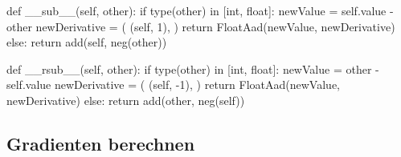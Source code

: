 \documentclass[
  a4paper,
  DIV=11]{scrreprt}
\newenvironment{Shaded}{\begin{snugshade}}{\end{snugshade}}
\newcommand{\BuiltInTok}[1]{\textcolor[rgb]{0.00,0.23,0.31}{#1}}
\newcommand{\ControlFlowTok}[1]{\textcolor[rgb]{0.00,0.23,0.31}{#1}}
\newcommand{\DecValTok}[1]{\textcolor[rgb]{0.68,0.00,0.00}{#1}}
\newcommand{\FunctionTok}[1]{\textcolor[rgb]{0.28,0.35,0.67}{#1}}
\newcommand{\KeywordTok}[1]{\textcolor[rgb]{0.00,0.23,0.31}{#1}}
\newcommand{\NormalTok}[1]{\textcolor[rgb]{0.00,0.23,0.31}{#1}}
\newcommand{\OperatorTok}[1]{\textcolor[rgb]{0.37,0.37,0.37}{#1}}
\newcommand{\VariableTok}[1]{\textcolor[rgb]{0.07,0.07,0.07}{#1}}
\theoremstyle{definition}
\theoremstyle{definition}
\theoremstyle{remark}
\begin{document}
\begin{tcolorbox}[enhanced jigsaw, titlerule=0mm, title=\textcolor{quarto-callout-tip-color}{\faLightbulb}\hspace{0.5em}{Lösung}, breakable, coltitle=black, leftrule=.75mm, bottomrule=.15mm, colback=white, rightrule=.15mm, opacitybacktitle=0.6, bottomtitle=1mm, toptitle=1mm, left=2mm, toprule=.15mm, colbacktitle=quarto-callout-tip-color!10!white, colframe=quarto-callout-tip-color-frame, arc=.35mm, opacityback=0]

\begin{Shaded}
\begin{Highlighting}[]
\KeywordTok{def} \FunctionTok{\_\_sub\_\_}\NormalTok{(}\VariableTok{self}\NormalTok{, other):}
    \ControlFlowTok{if} \BuiltInTok{type}\NormalTok{(other) }\KeywordTok{in}\NormalTok{ [}\BuiltInTok{int}\NormalTok{, }\BuiltInTok{float}\NormalTok{]:}
\NormalTok{        newValue }\OperatorTok{=} \VariableTok{self}\NormalTok{.value }\OperatorTok{{-}}\NormalTok{ other}
\NormalTok{        newDerivative }\OperatorTok{=}\NormalTok{ (}
\NormalTok{            (}\VariableTok{self}\NormalTok{, }\DecValTok{1}\NormalTok{),}
\NormalTok{        )}
        \ControlFlowTok{return}\NormalTok{ FloatAad(newValue, newDerivative)}
    \ControlFlowTok{else}\NormalTok{:}
        \ControlFlowTok{return}\NormalTok{ add(}\VariableTok{self}\NormalTok{, neg(other))}
        
\KeywordTok{def} \FunctionTok{\_\_rsub\_\_}\NormalTok{(}\VariableTok{self}\NormalTok{, other):}
    \ControlFlowTok{if} \BuiltInTok{type}\NormalTok{(other) }\KeywordTok{in}\NormalTok{ [}\BuiltInTok{int}\NormalTok{, }\BuiltInTok{float}\NormalTok{]:}
\NormalTok{        newValue }\OperatorTok{=}\NormalTok{ other }\OperatorTok{{-}} \VariableTok{self}\NormalTok{.value}
\NormalTok{        newDerivative }\OperatorTok{=}\NormalTok{ (}
\NormalTok{            (}\VariableTok{self}\NormalTok{, }\OperatorTok{{-}}\DecValTok{1}\NormalTok{),}
\NormalTok{        )}
        \ControlFlowTok{return}\NormalTok{ FloatAad(newValue, newDerivative)}
    \ControlFlowTok{else}\NormalTok{:}
        \ControlFlowTok{return}\NormalTok{ add(other, neg(}\VariableTok{self}\NormalTok{)) }
\end{Highlighting}
\end{Shaded}

\end{tcolorbox}

\hypertarget{gradienten-berechnen}{%
\subsection{Gradienten berechnen}\label{gradienten-berechnen}}
\end{document}
